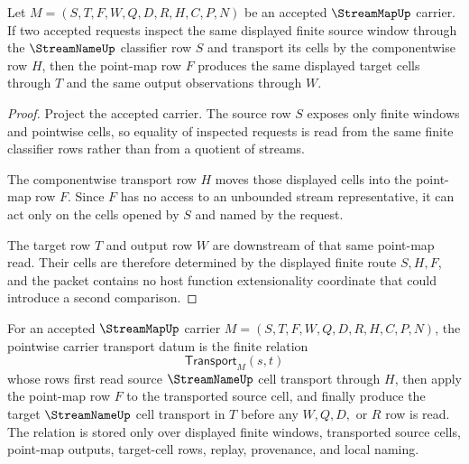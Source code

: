 \begin{theorem}
\label{thm:stream-map-pointwise-stability}
Let $M=(S,T,F,W,Q,D,R,H,C,P,N)$ be an accepted $\StreamMapUp$ carrier. If two accepted requests inspect the same displayed finite source window through the $\StreamNameUp$ classifier row $S$ and transport its cells by the componentwise row $H$, then the point-map row $F$ produces the same displayed target cells through $T$ and the same output observations through $W$.
\end{theorem}
\begin{proof}
Project the accepted carrier. The source row $S$ exposes only finite windows and pointwise cells, so equality of inspected requests is read from the same finite classifier rows rather than from a quotient of streams.

The componentwise transport row $H$ moves those displayed cells into the point-map row $F$. Since $F$ has no access to an unbounded stream representative, it can act only on the cells opened by $S$ and named by the request.

The target row $T$ and output row $W$ are downstream of that same point-map read. Their cells are therefore determined by the displayed finite route $S,H,F$, and the packet contains no host function extensionality coordinate that could introduce a second comparison.
\end{proof}

\begin{definition}
\label{def:stream-map-pointwise-carrier-transport}
For an accepted $\StreamMapUp$ carrier $M=(S,T,F,W,Q,D,R,H,C,P,N)$, the pointwise carrier transport datum is the finite relation
$$
\mathsf{Transport}_{M}(s,t)
$$
whose rows first read source $\StreamNameUp$ cell transport through $H$, then apply the point-map row $F$ to the transported source cell, and finally produce the target $\StreamNameUp$ cell transport in $T$ before any $W,Q,D,$ or $R$ row is read. The relation is stored only over displayed finite windows, transported source cells, point-map outputs, target-cell rows, replay, provenance, and local naming.
\end{definition}


